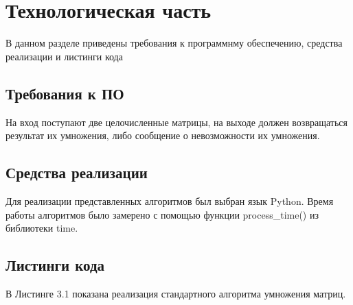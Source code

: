 \documentclass[a4paper,12pt]{report}
\begin{document}
\chapter{Технологическая часть}
\hspace{0.6cm}В данном разделе приведены требования к программнму обеспечению, средства реализации и листинги кода
\section{Требования к ПО}

\hspace{0.6cm}На вход поступают две целочисленные матрицы, на выходе должен возвращаться результат их умножения, либо сообщение о невозможности их умножения.
	

\section{Средства реализации}
\hspace{0.6cm}Для реализации представленных алгоритмов был выбран язык Python. Время работы алгоритмов было замерено с помощью функции process\_time() из библиотеки time.

\section{Листинги кода}

\hspace{0.6cm}В Листинге 3.1 показана реализация стандартного алгоритма умножения матриц.
\end{document}
